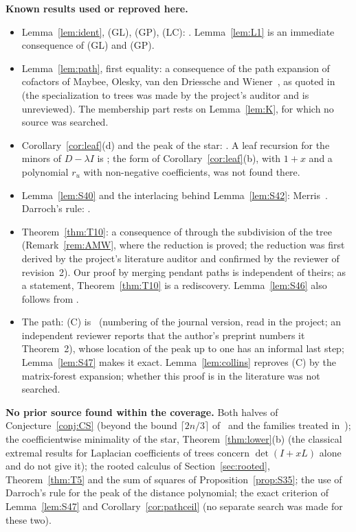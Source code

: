 \documentclass[11pt]{amsart}
\theoremstyle{definition}
\theoremstyle{remark}
\begin{document}
\smallskip
\noindent\textbf{Known results used or reproved here.}
\begin{itemize}
\item Lemma~\ref{lem:ident}, (GL), (GP), (LC): \cite{GL78,GP71,AAB}.
Lemma~\ref{lem:L1} is an immediate consequence of (GL) and (GP).
\item Lemma~\ref{lem:path}, first equality: a consequence of the path
expansion of cofactors of Maybee, Olesky, van den Driessche and
Wiener~\cite{MOvdDW}, as quoted in~\cite[eq.~(4)]{CS06} (the specialization to
trees was made by the project's auditor and is unreviewed). The membership
part rests on Lemma~\ref{lem:K}, for which no source was searched.
\item Corollary~\ref{cor:leaf}(d) and the peak of the star: \cite[Theorem~1]{Col89}.
A leaf recursion for the minors of $D-\lambda I$ is
\cite[Theorem~4]{Col86}; the form of Corollary~\ref{cor:leaf}(b), with
$1+x$ and a polynomial $r_u$ with non-negative coefficients, was not found
there.
\item Lemma~\ref{lem:S40} and the interlacing behind Lemma~\ref{lem:S42}:
Merris~\cite{Mer90}. Darroch's rule: \cite{Dar64,Pit97}.
\item Theorem~\ref{thm:T10}: a consequence of \cite[Theorem~4.4 with
Lemma~4.2]{AMW} through the subdivision of the tree (Remark~\ref{rem:AMW},
where the reduction is proved; the reduction was first derived by the
project's literature auditor and confirmed by the reviewer of revision~2).
Our proof by merging pendant paths is independent of theirs; as a statement,
Theorem~\ref{thm:T10} is a rediscovery. Lemma~\ref{lem:S46} also follows
from \cite[Lemma~4.2]{AMW}.
\item The path: (C) is~\cite[Theorem~3]{Col89} (numbering of the journal
version, read in the project; an independent reviewer reports that the
author's preprint numbers it Theorem~2), whose location of the peak up to one
has an informal last step; Lemma~\ref{lem:S47} makes it exact.
Lemma~\ref{lem:collins} reproves (C) by the matrix-forest expansion; whether
this proof is in the literature was not searched.
\end{itemize}

\noindent\textbf{No prior source found within the coverage.}
Both halves of Conjecture~\ref{conj:CS} (beyond the bound
$\lceil2n/3\rceil$ of~\cite{AAB} and the families treated in~\cite{Col89});
the coefficientwise minimality of the star, Theorem~\ref{thm:lower}(b) (the
classical extremal results for Laplacian coefficients of trees concern
$\det(I+xL)$ alone and do not give it); the rooted calculus of
Section~\ref{sec:rooted}, Theorem~\ref{thm:T5} and the sum of squares of
Proposition~\ref{prop:S35}; the use of Darroch's rule for the peak of the
distance polynomial; the exact criterion of Lemma~\ref{lem:S47} and
Corollary~\ref{cor:pathceil} (no separate search was made for these two).
\end{document}
